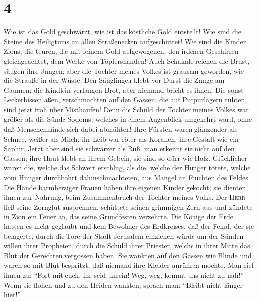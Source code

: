\hypertarget{section-3}{%
\section{4}\label{section-3}}

 Wie ist das Gold geschwärzt, wie ist das köstliche Gold
entstellt! Wie sind die Steine des Heiligtums an allen Straßenecken
aufgeschüttet!  Wie sind die Kinder Zions, die teuren, die
mit feinem Gold aufgewogenen, den irdenen Geschirren gleichgeachtet, dem
Werke von Töpfershänden!  Auch Schakale reichen die Brust,
säugen ihre Jungen; aber die Tochter meines Volkes ist grausam geworden,
wie die Strauße in der Wüste.  Den Säuglingen klebt vor
Durst die Zunge am Gaumen; die Kindlein verlangen Brot, aber niemand
bricht es ihnen.  Die sonst Leckerbissen aßen,
verschmachten auf den Gassen; die auf Purpurlagern ruhten, sind jetzt
froh über Misthaufen!  Denn die Schuld der Tochter meines
Volkes war größer als die Sünde Sodoms, welches in einem Augenblick
umgekehrt ward, ohne daß Menschenhände sich dabei abmühten!
 Ihre Fürsten waren glänzender als Schnee, weißer als
Milch, ihr Leib war röter als Korallen, ihre Gestalt wie ein Saphir.
 Jetzt aber sind sie schwärzer als Ruß, man erkennt sie
nicht auf den Gassen; ihre Haut klebt an ihrem Gebein, sie sind so dürr
wie Holz.  Glücklicher waren die, welche das Schwert
erschlug, als die, welche der Hunger tötete, welche vom Hunger
durchbohrt dahinschmachteten, aus Mangel an Früchten des Feldes.
 Die Hände barmherziger Frauen haben ihre eigenen Kinder
gekocht; sie dienten ihnen zur Nahrung, beim Zusammenbruch der Tochter
meines Volks.  Der \textsc{Herr} ließ seine Zornglut
ausbrennen, schüttete seinen grimmigen Zorn aus und zündete in Zion ein
Feuer an, das seine Grundfesten verzehrte.  Die Könige
der Erde hätten es nicht geglaubt und kein Bewohner des Erdkreises, daß
der Feind, der sie belagerte, durch die Tore der Stadt Jerusalem
einziehen würde  um der Sünden willen ihrer Propheten,
durch die Schuld ihrer Priester, welche in ihrer Mitte das Blut der
Gerechten vergossen haben.  Sie wankten auf den Gassen
wie Blinde und waren so mit Blut bespritzt, daß niemand ihre Kleider
anrühren mochte.  Man rief ihnen zu: ``Fort mit euch, ihr
seid unrein! Weg, weg, kommt uns nicht zu nah!'' Wenn sie flohen und zu
den Heiden wankten, sprach man: ``Bleibt nicht länger hier!''
